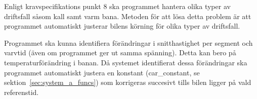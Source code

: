 Enligt kravspecifikations punkt 8 ska programmet hantera olika typer av
driftsfall såsom kall samt varm bana. Metoden för att lösa detta problem är
att programmet automatiskt justerar bilens körning för olika typer av
driftsfall. 


Programmet ska kunna identifiera förändringar i snitthastighet per
segment och varvtid (även om programmet ger ut samma spänning). Detta kan bero på temperaturförändring i banan. Då systemet identifierat dessa förändringar ska programmet
automatiskt justera en konstant (car\_constant, se sektion~\ref{sec:system_a_funcs}) som korrigeras succesivt tills bilen ligger på vald referenstid. 

